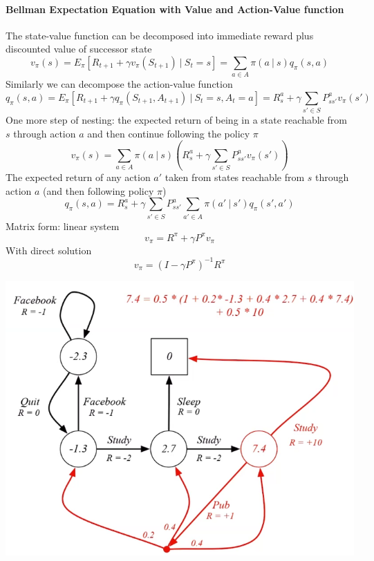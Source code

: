 \documentclass[10pt]{report}
\begin{document}
\paragraph{Bellman Expectation Equation with Value and Action-Value function}
The state-value function can be decomposed into immediate reward plus discounted value of successor state
$$v_\pi(s) = E_\pi[R_{t+1} + \gamma v_\pi(S_{t+1})\:|\:S_t=s] = \sum_{a\in A }\pi(a\:|\:s)q_\pi(s,a)$$
Similarly we can decompose the action-value function
$$q_\pi(s,a) = E_\pi[R_{t+1}+\gamma q_\pi(S_{t+1}, A_{t+1})\:|\:S_t=s, A_t=a] = R_s^a + \gamma\sum_{s'\in S} P_{ss'}^av_\pi(s')$$
One more step of nesting: the expected return of being in a state reachable from $s$ through action $a$ and then continue following the policy $\pi$
$$v_\pi(s) = \sum_{a\in A} \pi(a\:|\:s) \left(R_s^a + \gamma\sum_{s'\in S} P_{ss'}^a v_\pi(s')\right)$$
The expected return of any action $a'$ taken from states reachable from $s$ through action $a$ (and then following policy $\pi$)
$$q_\pi(s,a) = R_s^a + \gamma\sum_{s'\in S}P_{ss'}^a \sum_{a'\in A}\pi(a'\:|\:s')q_\pi(s',a')$$
Matrix form: linear system
$$v_\pi = R^\pi + \gamma P^\pi v_\pi$$
With direct solution
$$v_\pi = (I-\gamma P^\pi)^{-1}R^\pi$$
\begin{center}
	\includegraphics[scale=0.5]{162.png}
\end{center}
\end{document}
